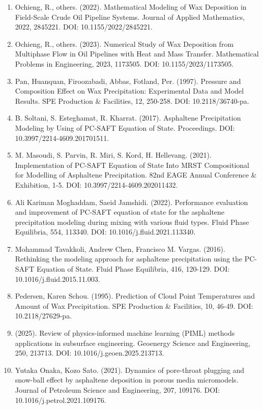 \documentclass[11pt]{extarticle}
\begin{document}
\begin{enumerate}
  (2023). Novel Nuclear Magnetic Resonance Techniques To Assess the Wax Precipitation Evolution in Crude Oil Systems. Energy \& Fuels. DOI: 10.1021/acs.energyfuels.2c03309.
\item
  Ochieng, R., others. (2022). Mathematical Modeling of Wax Deposition in Field-Scale Crude Oil Pipeline Systems. Journal of Applied Mathematics, 2022, 2845221. DOI: 10.1155/2022/2845221.
\item
  Ochieng, R., others. (2023). Numerical Study of Wax Deposition from Multiphase Flow in Oil Pipelines with Heat and Mass Transfer. Mathematical Problems in Engineering, 2023, 1173505. DOI: 10.1155/2023/1173505.
\item
  Pan, Huanquan, Firoozabadi, Abbas, Fotland, Per. (1997). Pressure and Composition Effect on Wax Precipitation: Experimental Data and Model Results. SPE Production \& Facilities, 12, 250-258. DOI: 10.2118/36740-pa.
\item
  B. Soltani, S. Esteghamat, R. Kharrat. (2017). Asphaltene Precipitation Modeling by Using of PC-SAFT Equation of State. Proceedings. DOI: 10.3997/2214-4609.201701511.
\item
  M. Masoudi, S. Parvin, R. Miri, S. Kord, H. Hellevang. (2021). Implementation of PC-SAFT Equation of State Into MRST Compositional for Modelling of Asphaltene Precipitation. 82nd EAGE Annual Conference \& Exhibition, 1-5. DOI: 10.3997/2214-4609.202011432.
\item
  Ali Kariman Moghaddam, Saeid Jamshidi. (2022). Performance evaluation and improvement of PC-SAFT equation of state for the asphaltene precipitation modeling during mixing with various fluid types. Fluid Phase Equilibria, 554, 113340. DOI: 10.1016/j.fluid.2021.113340.
\item
  Mohammad Tavakkoli, Andrew Chen, Francisco M. Vargas. (2016). Rethinking the modeling approach for asphaltene precipitation using the PC-SAFT Equation of State. Fluid Phase Equilibria, 416, 120-129. DOI: 10.1016/j.fluid.2015.11.003.
\item
  Pedersen, Karen Schou. (1995). Prediction of Cloud Point Temperatures and Amount of Wax Precipitation. SPE Production \& Facilities, 10, 46-49. DOI: 10.2118/27629-pa.
\item
  (2025). Review of physics-informed machine learning (PIML) methods applications in subsurface engineering. Geoenergy Science and Engineering, 250, 213713. DOI: 10.1016/j.geoen.2025.213713.
\item
  Yutaka Onaka, Kozo Sato. (2021). Dynamics of pore-throat plugging and snow-ball effect by asphaltene deposition in porous media micromodels. Journal of Petroleum Science and Engineering, 207, 109176. DOI: 10.1016/j.petrol.2021.109176.

\end{enumerate}
\end{document}
